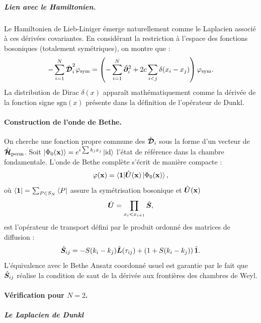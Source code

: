 \subparagraph{Lien avec le Hamiltonien.} Le Hamiltonien de Lieb-Liniger émerge naturellement comme le Laplacien associé à ces dérivées covariantes. En considérant la restriction à l'espace des fonctions bosoniques (totalement symétriques), on montre que :
\begin{equation}
    -\sum_{i=1}^N \hat{\bm{\mathcal{D}}}_i^2 \varphi_{\text{sym}} = \left( -\sum_{i=1}^N \hat{\bm{\partial}}_i^2 + 2c \sum_{i<j} \delta(x_i - x_j) \right) \varphi_{\text{sym}}.
\end{equation}
La distribution de Dirac $\delta(x)$ apparaît mathématiquement comme la dérivée de la fonction signe $\text{sgn}(x)$ présente dans la définition de l'opérateur de Dunkl.

\paragraph{Construction de l'onde de Bethe.}

On cherche une fonction propre commune des $\hat{\bm{\mathcal{D}}}_i$ sous la forme d'un vecteur de $\hat{\bm{\mathcal{H}}}_{\text{perm}}$. Soit $\ket{\Phi_0(\mathbf{x})} = e^{i \sum k_j x_j} \ket{\text{id}}$ l'état de référence dans la chambre fondamentale. L'onde de Bethe complète s'écrit de manière compacte :
\begin{equation}
    \varphi(\mathbf{x}) = \langle \mathbf{1} | \hat{\bm{U}}(\mathbf{x}) \ket{\Phi_0(\mathbf{x})},
\end{equation}
où $\bra{\mathbf{1}} = \sum_{P \in S_N} \bra{P}$ assure la symétrisation bosonique et $\hat{\bm{U}}(\mathbf{x})$ 
\begin{equation}
    \hat{\bm{U}} = \prod_{x_i<x_{i+1}} \hat{\bm{S}},
\end{equation}
est l'opérateur de transport défini par le produit ordonné des matrices de diffusion :
\begin{equation}
    \hat{\bm{S}}_{ij} = -S(k_i - k_j) \hat{\bm{L}}(\tau_{ij}) + \left( 1 + S(k_i - k_j) \right) \hat{\bm{\mathbf{1}}}.
\end{equation}
L'équivalence avec le Bethe Ansatz coordonné usuel est garantie par le fait que $\hat{\bm{S}}_{ij}$ réalise la condition de saut de la dérivée aux frontières des chambres de Weyl.

\paragraph{Vérification pour $N=2$.}

\subparagraph{Le Laplacien de Dunkl}

